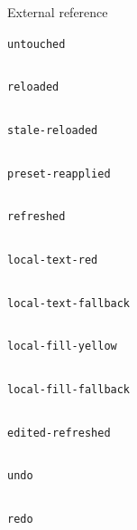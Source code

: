 \documentclass{article}
\begin{document}

\noindent External reference\par
{}
\par\noindent\texttt{untouched}\par
\[\]

\par\noindent\texttt{reloaded}\par
\[\]

\par\noindent\texttt{stale-reloaded}\par
\[\]

\par\noindent\texttt{preset-reapplied}\par
\[\]

\par\noindent\texttt{refreshed}\par
\[\]

\par\noindent\texttt{local-text-red}\par
\[\]

\par\noindent\texttt{local-text-fallback}\par
\[\]

\par\noindent\texttt{local-fill-yellow}\par
\[\]

\par\noindent\texttt{local-fill-fallback}\par
\[\]

\par\noindent\texttt{edited-refreshed}\par
\[\]

\par\noindent\texttt{undo}\par
\[\]

\par\noindent\texttt{redo}\par
\[\]
\end{document}
